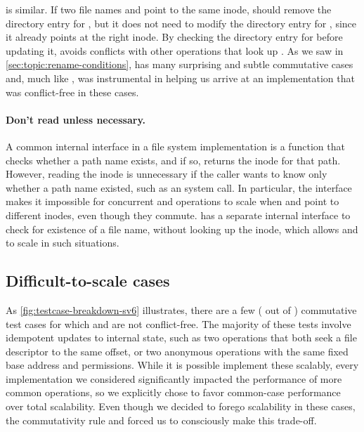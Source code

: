  is similar.  If two file names  and 
point to the
same inode,  should remove the directory entry for
, but it does not need to modify the directory entry for
, since
it already points at the right inode.  By checking the directory
entry for  before updating it,  avoids
conflicts with other operations that look up .
%
As we saw in \cref{sec:topic:rename-conditions},  has
many surprising and subtle commutative cases and, much like
, \tool was instrumental in helping us arrive at an
implementation that was conflict-free in these cases.


\paragraph{Don't read unless necessary.}  A common internal interface
in a file system implementation is a  function that
checks whether a path name exists, and if so, returns the inode for
that path.
%
However, reading the inode is unnecessary
if the caller wants to know only whether a path name existed, such as
an  system call.  In particular, the 
interface makes it impossible for concurrent 
and  operations to scale when  and 
point to different inodes, even though they commute.
\fs has a separate internal interface to check for existence of a
file name, without looking up the inode, which allows 
and  to scale in such situations.


\subsection{Difficult-to-scale cases}

As \cref{fig:testcase-breakdown-sv6} illustrates, there are a few
( out of )
commutative test cases for
which \vm and \fs are not conflict-free.
%
The majority of these tests involve idempotent updates to internal
state, such as two  operations that both seek a file
descriptor to the same offset, or two anonymous  operations
with the same fixed base address and permissions.  While it is
possible implement these scalably, every implementation we considered
significantly impacted the performance of more common operations, so
we explicitly chose to favor common-case performance over total
scalability.  Even though we decided to forego scalability in these
cases, the commutativity rule and \tool forced us to consciously make
this trade-off.
%

